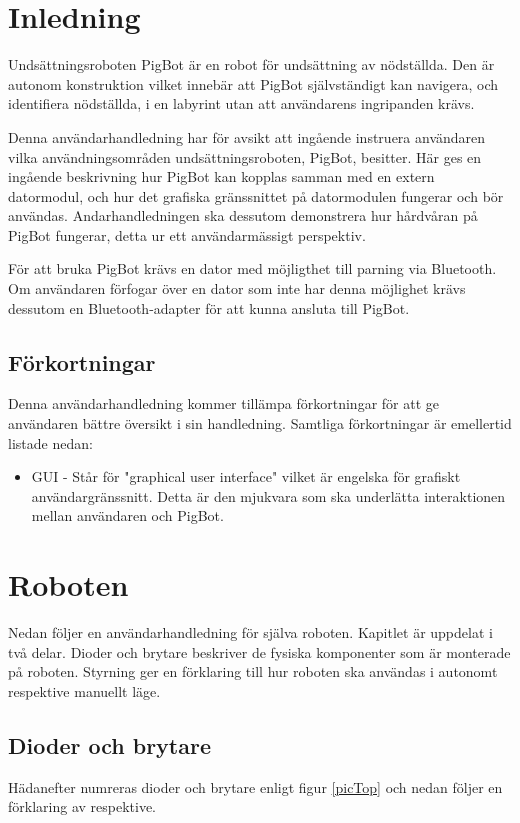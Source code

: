 \documentclass[11pt]{article}
\begin{document}
\pagebreak
\section{Inledning}
Undsättningsroboten PigBot är en robot för undsättning av nödställda. Den är autonom konstruktion vilket innebär att PigBot självständigt kan navigera, och identifiera nödställda, i en labyrint utan att användarens ingripanden krävs.

Denna användarhandledning har för avsikt att ingående instruera användaren vilka användningsområden undsättningsroboten, PigBot, besitter. Här ges en ingående beskrivning hur PigBot kan kopplas samman med en extern datormodul, och hur det grafiska gränssnittet på datormodulen fungerar och bör användas. Andarhandledningen ska dessutom demonstrera hur hårdvåran på PigBot fungerar, detta ur ett användarmässigt perspektiv. 

För att bruka PigBot krävs en dator med möjligthet till parning via Bluetooth\textsuperscript{\circledR}. Om användaren förfogar över en dator som inte har denna möjlighet krävs dessutom en Bluetooth\textsuperscript{\circledR}-adapter för att kunna ansluta till PigBot.

\subsection{Förkortningar}
Denna användarhandledning kommer tillämpa förkortningar för att ge användaren bättre översikt i sin handledning. Samtliga förkortningar är emellertid listade nedan:

\begin{itemize}
\item GUI - Står för "graphical user interface" vilket är engelska för grafiskt användargränssnitt. Detta är den mjukvara som ska underlätta interaktionen mellan användaren och PigBot.
\end{itemize}

\section{Roboten}
Nedan följer en användarhandledning för själva roboten. Kapitlet är uppdelat i två delar. Dioder och brytare beskriver de fysiska komponenter som är monterade på roboten. Styrning ger en förklaring till hur roboten ska användas i autonomt respektive manuellt läge.

\subsection{Dioder och brytare}
Hädanefter numreras dioder och brytare enligt figur \ref{picTop} och nedan följer en förklaring av respektive.
\end{document}
